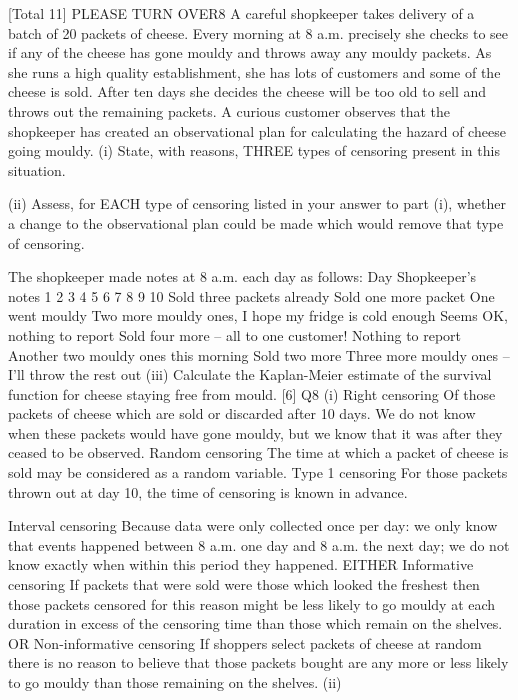 \documentclass[a4paper,12pt]{article}
\begin{document}
[Total 11]
PLEASE TURN OVER8
A careful shopkeeper takes delivery of a batch of 20 packets of cheese. Every
morning at 8 a.m. precisely she checks to see if any of the cheese has gone mouldy
and throws away any mouldy packets.
As she runs a high quality establishment, she has lots of customers and some of the
cheese is sold. After ten days she decides the cheese will be too old to sell and throws
out the remaining packets.
A curious customer observes that the shopkeeper has created an observational plan for
calculating the hazard of cheese going mouldy.
(i) State, with reasons, THREE types of censoring present in this situation.

(ii) Assess, for EACH type of censoring listed in your answer to part (i), whether a
change to the observational plan could be made which would remove that type
of censoring.

The shopkeeper made notes at 8 a.m. each day as follows:
Day Shopkeeper’s notes
1
2
3
4
5
6
7
8
9
10 Sold three packets already
Sold one more packet
One went mouldy
Two more mouldy ones, I hope my fridge is cold enough
Seems OK, nothing to report
Sold four more – all to one customer!
Nothing to report
Another two mouldy ones this morning
Sold two more
Three more mouldy ones – I’ll throw the rest out
(iii) Calculate the Kaplan-Meier estimate of the survival function for cheese
staying free from mould.
[6]
Q8
(i)
Right censoring 
Of those packets of cheese which are sold or discarded after 10 days.
We do not know when these packets would have gone mouldy, but
we know that it was after they ceased to be observed. 
Random censoring 
The time at which a packet of cheese is sold may be considered as
a random variable. 
Type 1 censoring 
For those packets thrown out at day 10, the time of censoring is known in
advance.

Interval censoring 
Because data were only collected once per day: we only know that
events happened between 8 a.m. one day and 8 a.m. the next day;
we do not know exactly when within this period they happened. 
EITHER
Informative censoring 
If packets that were sold were those which looked the freshest then
those packets censored for this reason might be less likely to go
mouldy at each duration in excess of the censoring time than those
which remain on the shelves. 
OR
Non-informative censoring
If shoppers select packets of cheese at random there is no reason to
believe that those packets bought are any more or less likely to go
mouldy than those remaining on the shelves.
(ii)
\end{document}
